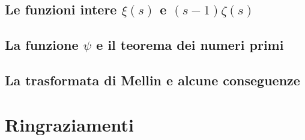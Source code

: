 \documentclass{article}
\begin{document}
\subsection{Le funzioni intere $\xi(s)$ e $(s-1)\zeta(s)$}


\subsection{La funzione $\psi$ e il teorema dei numeri primi}


\subsection{La trasformata di Mellin e alcune conseguenze}


\newpage



\section*{Ringraziamenti}

\end{document}
